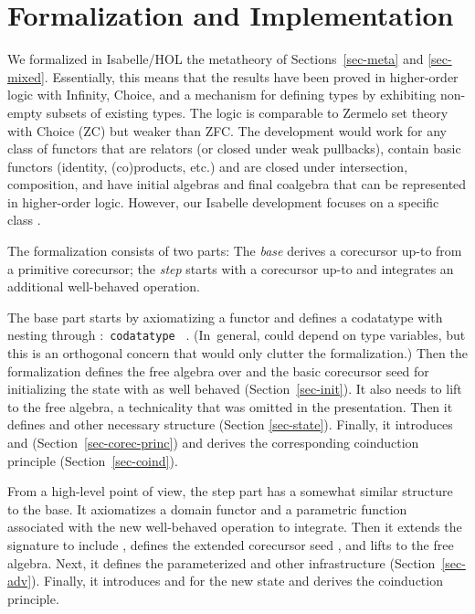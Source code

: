 \documentclass[preprint,draft]
{sigplanconf}
\newcommand\keyw[1]{\texttt{#1}}
\newcommand{\<}{\langle}
\renewcommand{\>}{\rangle}
\begin{document}
\section{Formalization and Implementation}
\label{sec-for}

We formalized in Isabelle/HOL the metatheory of Sections~\ref{sec-meta} and \ref{sec-mixed}.
Essentially, this means that the results have been proved
in higher-order logic
with Infinity, Choice, and a mechanism for defining
types by exhibiting non-empty subsets of existing types. The logic is
comparable to Zermelo set theory with Choice (ZC) but weaker than ZFC.
The development would work for any class of functors that are relators
(or closed under weak pullbacks), contain basic functors (identity,
(co)products, etc.) and are closed under intersection, composition, and
have initial algebras and final coalgebra that can be represented in higher-order logic.
However, our Isabelle development focuses on a specific class \cite{traytel-et-al-2012}.



The formalization consists of two parts: The \emph{base} derives a corecursor
up-to from a primitive corecursor; the \emph{step} starts with a corecursor
up-to and integrates an additional well-behaved operation.

The base part starts by axiomatizing a functor 
and defines a codatatype with nesting through :\,
\keyw{codatatype} \,  .
(In~general,  could depend on type variables, but this is an orthogonal concern that would only clutter the formalization.)
Then the formalization defines the free algebra over  and
the basic corecursor seed  for initializing the state with
 as well behaved (Section~\ref{sec-init}). It also needs to lift
 to the free algebra, a technicality that was omitted in the
presentation. Then it defines  and other necessary structure
(Section \ref{sec-state}). Finally, it introduces  and 
(Section~\ref{sec-corec-princ}) and derives the corresponding
coinduction principle (Section~\ref{sec-coind}).

From a high-level point of view, the step part has a somewhat similar structure to the base. It
axiomatizes a domain functor  and a parametric function  associated
with the new well-behaved operation  to integrate.
Then it extends the signature to include , defines the
extended corecursor seed , and lifts  to the free algebra.
Next, it defines the parameterized  and other infrastructure
(Section~\ref{sec-adv}). Finally, it introduces  and 
for the new state and derives the coinduction principle.
\end{document}
